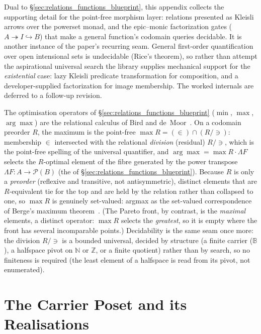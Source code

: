\documentclass[11pt, a4paper]{article}
\begin{document}
Dual to §\ref{sec:relations_functions_blueprint}, this appendix collects the supporting detail for the point-free morphism layer: relations presented as Kleisli arrows over the powerset monad, and the epic--monic factorization gates ($A \twoheadrightarrow I \hookrightarrow B$) that make a general function's codomain queries decidable.
It is another instance of the paper's recurring seam.
General first-order quantification over open intensional sets is undecidable (Rice's theorem), so rather than attempt the aspirational universal search the library supplies mechanical support for the \emph{existential} case: lazy Kleisli predicate transformation for composition, and a developer-supplied factorization for image membership.
The worked internals are deferred to a follow-up revision.

The optimisation operators of §\ref{sec:relations_functions_blueprint} ($\min$, $\max$, $\arg\max$) are the relational calculus of Bird and de~Moor~\cite{birddemoor1997aop}.
On a codomain preorder $R$, the maximum is the point-free $\max R = (\in) \cap (R / \ni)$: membership $\in$ intersected with the relational \emph{division} (residual) $R / \ni$, which is the point-free spelling of the universal quantifier, and $\arg\max = \max R \cdot \Lambda F$ selects the $R$-optimal element of the fibre generated by the power transpose $\Lambda F : A \to \mathcal{P}(B)$ (the  of §\ref{sec:relations_functions_blueprint}).
Because $R$ is only a \emph{preorder} (reflexive and transitive, not antisymmetric), distinct elements that are $R$-equivalent tie for the top and are held by the relation rather than collapsed to one, so $\max R$ is genuinely set-valued: argmax as the set-valued correspondence of Berge's maximum theorem~\cite{berge1963topological}.  (The Pareto front, by contrast, is the \emph{maximal} elements, a distinct operator: $\max R$ selects the \emph{greatest}, so it is empty where the front has several incomparable points.)
Decidability is the same seam once more: the division $R / \ni$ is a bounded universal, decided by structure (a finite carrier ($\mathbb{B}$), a halfspace pivot on $\mathbb{N}$ or $\mathbb{Z}$, or a finite quotient) rather than by search, so no finiteness is required (the least element of a halfspace is read from its pivot, not enumerated).

\clearpage
\section{The Carrier Poset and its Realisations}
\label{sec:carrier-rosetta}
\end{document}
